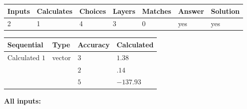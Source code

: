 \documentclass[12pt]{article}
\begin{document}
 
 
\noindent{}
 
 

 
 
\vspace{0.3in}
   
   
   
   
\noindent\begin{tabular}{|l|l|l|l|l|l|l|}
 \hline
Inputs & Calculates & Choices & Layers & Matches & Answer & Solution \\ \hline
           2 & 
           1 & 
           4
  & 
           3 & 
           0 & 
  yes & 
  yes 
  \\ \hline
 \end{tabular}
   
   
   
   
\noindent{}
   
   
  
  
\noindent\begin{tabular}{|l|l|l|l|}
\hline
 Sequential & Type & Accuracy & Calculated \\ 
\hline
 
 
  Calculated $           1$ & vector &  
  $           3 $ 
 &  $ 1.38 $ 
 \\    
  & & 
  $           2 $ 
 &  $ .14 $ 
 \\    
  & & 
  $           5 $ 
 &  $ -137.93 $ 
 \\  \hline  
 \end{tabular}
   
   
   
   
\noindent\vspace{0.1in}\hspace{-0.08in} {\textbf{\Large{All inputs: }}}
   
   
  
\end{document}
